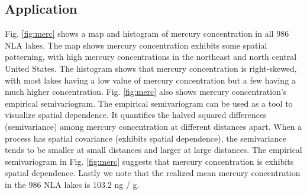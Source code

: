 \documentclass[]{elsarticle} %
\begin{document}
\hypertarget{sec:r_app}{%
\subsection{Application}\label{sec:r_app}}

Fig. \ref{fig:merc} shows a map and histogram of mercury concentration
in all 986 NLA lakes. The map shows mercury concentration exhibits some
spatial patterning, with high mercury concentrations in the northeast
and north central United States. The histogram shows that mercury
concentration is right-skewed, with most lakes having a low value of
mercury concentration but a few having a much higher concentration. Fig.
\ref{fig:merc} also shows mercury concentration's empirical
semivariogram. The empirical semivariogram can be used as a tool to
visualize spatial dependence. It quantifies the halved squared
differences (semivariance) among mercury concentration at different
distances apart. When a process has spatial covariance (exhibits spatial
dependence), the semivariance tends to be smaller at small distances and
larger at large distances. The empirical semivariogram in Fig.
\ref{fig:merc} suggests that mercury concentration is exhibits spatial
dependence. Lastly we note that the realized mean mercury concentration
in the 986 NLA lakes is 103.2 ng / g.
\end{document}
